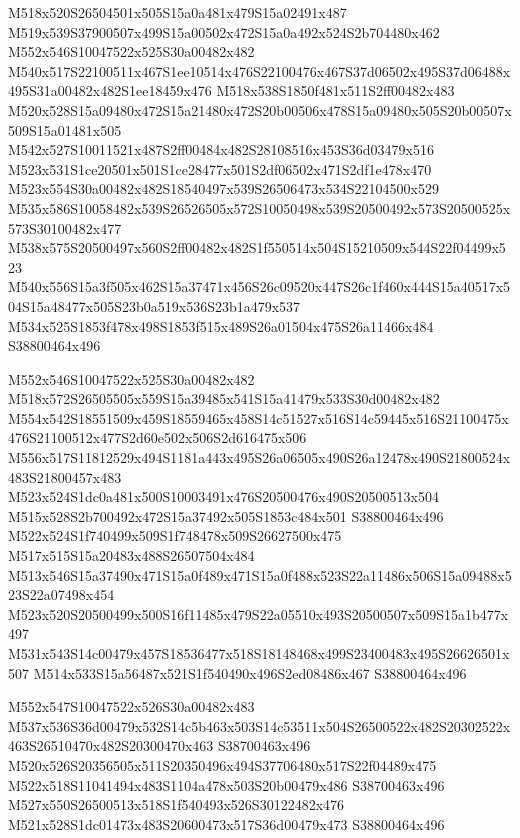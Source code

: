 \documentclass{article}
\begin{document}
\begin{multicols}{2}
M518x520S26504501x505S15a0a481x479S15a02491x487 M519x539S37900507x499S15a00502x472S15a0a492x524S2b704480x462 M552x546S10047522x525S30a00482x482 M540x517S22100511x467S1ee10514x476S22100476x467S37d06502x495S37d06488x495S31a00482x482S1ee18459x476 M518x538S1850f481x511S2ff00482x483 M520x528S15a09480x472S15a21480x472S20b00506x478S15a09480x505S20b00507x509S15a01481x505 M542x527S10011521x487S2ff00484x482S28108516x453S36d03479x516 M523x531S1ce20501x501S1ce28477x501S2df06502x471S2df1e478x470 M523x554S30a00482x482S18540497x539S26506473x534S22104500x529 M535x586S10058482x539S26526505x572S10050498x539S20500492x573S20500525x573S30100482x477 M538x575S20500497x560S2ff00482x482S1f550514x504S15210509x544S22f04499x523 M540x556S15a3f505x462S15a37471x456S26c09520x447S26c1f460x444S15a40517x504S15a48477x505S23b0a519x536S23b1a479x537 M534x525S1853f478x498S1853f515x489S26a01504x475S26a11466x484 S38800464x496 

M552x546S10047522x525S30a00482x482 M518x572S26505505x559S15a39485x541S15a41479x533S30d00482x482 M554x542S18551509x459S18559465x458S14c51527x516S14c59445x516S21100475x476S21100512x477S2d60e502x506S2d616475x506 M556x517S11812529x494S1181a443x495S26a06505x490S26a12478x490S21800524x483S21800457x483 M523x524S1dc0a481x500S10003491x476S20500476x490S20500513x504 M515x528S2b700492x472S15a37492x505S1853c484x501 S38800464x496 M522x524S1f740499x509S1f748478x509S26627500x475 M517x515S15a20483x488S26507504x484 M513x546S15a37490x471S15a0f489x471S15a0f488x523S22a11486x506S15a09488x523S22a07498x454 M523x520S20500499x500S16f11485x479S22a05510x493S20500507x509S15a1b477x497 M531x543S14c00479x457S18536477x518S18148468x499S23400483x495S26626501x507 M514x533S15a56487x521S1f540490x496S2ed08486x467 S38800464x496 

M552x547S10047522x526S30a00482x483 M537x536S36d00479x532S14c5b463x503S14c53511x504S26500522x482S20302522x463S26510470x482S20300470x463 S38700463x496 M520x526S20356505x511S20350496x494S37706480x517S22f04489x475 M522x518S11041494x483S1104a478x503S20b00479x486 S38700463x496 M527x550S26500513x518S1f540493x526S30122482x476 M521x528S1dc01473x483S20600473x517S36d00479x473 S38800464x496



\end{multicols}
\end{document}
